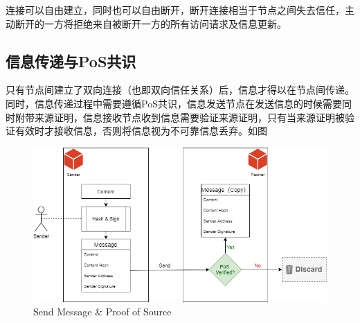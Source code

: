 \documentclass[12pt,a4paper]{extarticle}
\begin{document}
    连接可以自由建立，同时也可以自由断开，断开连接相当于节点之间失去信任，主动断开的一方将拒绝来自被断开一方的所有访问请求及信息更新。
\subsection{信息传递与PoS共识}\label{msg_and_pos}
    只有节点间建立了双向连接（也即双向信任关系）后，信息才得以在节点间传递。同时，信息传递过程中需要遵循PoS共识，信息发送节点在发送信息的时候需要同时附带来源证明，信息接收节点收到信息需要验证来源证明，只有当来源证明被验证有效时才接收信息，否则将信息视为不可靠信息丢弃。如图

    \begin{figure}[H]
        \centering
        \includegraphics[width=\textwidth]{figures-pos.png}
        \caption{Send Message \& Proof of Source}
    \end{figure}
\end{document}
